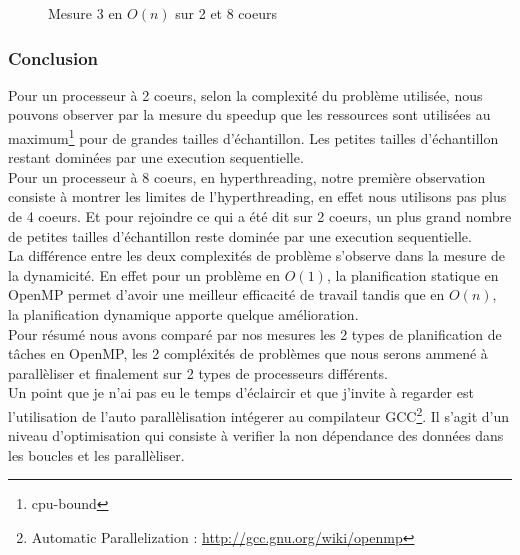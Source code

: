 \begin{figure}[here]
\caption{Mesure 3 en $O(n)$ sur 2 et 8 coeurs}
\label{fig:mesure_3_variable}
\end{figure}

\subsubsection{Conclusion}

Pour un processeur à 2 coeurs, selon la complexité du problème utilisée, nous pouvons observer par la mesure du speedup que les ressources sont utilisées au maximum\footnote{cpu-bound} pour de grandes tailles d'échantillon. Les petites tailles d'échantillon restant dominées par une execution sequentielle.\\

Pour un processeur à 8 coeurs, en hyperthreading, notre première observation consiste à montrer les limites de l'hyperthreading, en effet nous utilisons pas plus de 4 coeurs. Et pour rejoindre ce qui a été dit sur 2 coeurs, un plus grand nombre de petites tailles d'échantillon reste dominée par une execution sequentielle.\\

La différence entre les deux complexités de problème s'observe dans la mesure de la dynamicité. En effet pour un problème en $O(1)$, la planification statique en OpenMP permet d'avoir une meilleur efficacité de travail tandis que en $O(n)$, la planification dynamique apporte quelque amélioration.\\

Pour résumé nous avons comparé par nos mesures les 2 types de planification de tâches en OpenMP, les 2 compléxités de problèmes que nous serons ammené à parallèliser et finalement sur 2 types de processeurs différents.\\

Un point que je n'ai pas eu le temps d'éclaircir et que j'invite à regarder est l'utilisation de l'auto parallèlisation intégerer au compilateur GCC\footnote{Automatic Parallelization : \url{http://gcc.gnu.org/wiki/openmp}}. Il s'agit d'un niveau d'optimisation qui consiste à verifier la non dépendance des données dans les boucles et les parallèliser.
